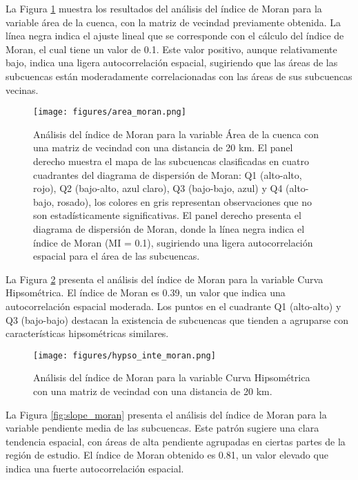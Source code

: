 \documentclass[
  manuscript=article,  
  layout=preprint,  
  year=2023,
  volume=0,
]{format}
\begin{document}
La Figura \ref{fig:area_moran} muestra los resultados del análisis del índice de Moran para la variable área de la cuenca, con la matriz de vecindad previamente obtenida. La línea negra indica el ajuste lineal que se corresponde con el cálculo del índice de Moran, el cual tiene un valor de 0.1. Este valor positivo, aunque relativamente bajo, indica una ligera autocorrelación espacial, sugiriendo que las áreas de las subcuencas están moderadamente correlacionadas con las áreas de sus subcuencas vecinas.

\begin{figure}[ht!]
    \centering
      {\texttt{[image: figures/area\_moran.png]}}
\caption{Análisis del índice de Moran para la variable Área de la cuenca con una matriz de vecindad con una distancia de 20 km. El panel derecho muestra el mapa de las subcuencas clasificadas en cuatro cuadrantes del diagrama de dispersión de Moran: Q1 (alto-alto, rojo), Q2 (bajo-alto, azul claro), Q3 (bajo-bajo, azul) y Q4 (alto-bajo, rosado), los colores en gris representan observaciones que no son estadísticamente significativas. El panel derecho presenta el diagrama de dispersión de Moran, donde la línea negra indica el índice de Moran (MI = 0.1), sugiriendo una ligera autocorrelación espacial para el área de las subcuencas.}
    \label{fig:area_moran}
\end{figure}

La Figura \ref{fig:hypso_moran} presenta el análisis del índice de Moran para la variable Curva Hipsométrica. El índice de Moran es 0.39, un valor que indica una autocorrelación espacial moderada. Los puntos en el cuadrante Q1 (alto-alto) y Q3 (bajo-bajo) destacan la existencia de subcuencas que tienden a agruparse con características hipsométricas similares.

\begin{figure}[ht!]
    \centering
      {\texttt{[image: figures/hypso\_inte\_moran.png]}}
\caption{Análisis del índice de Moran para la variable Curva Hipsométrica con una matriz de vecindad con una distancia de 20 km.}
    \label{fig:hypso_moran}
\end{figure}

La Figura \ref{fig:slope_moran} presenta el análisis del índice de Moran para la variable pendiente media de las subcuencas. Este patrón sugiere una clara tendencia espacial, con áreas de alta pendiente agrupadas en ciertas partes de la región de estudio. El índice de Moran obtenido es 0.81, un valor elevado que indica una fuerte autocorrelación espacial.
\end{document}

